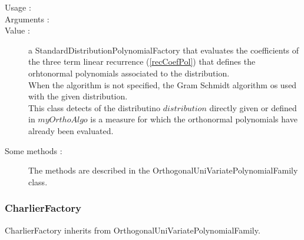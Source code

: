 \begin{description}
\item[Usage :] \rule{0pt}{1em}


\item[Arguments :] \rule{0pt}{1em}


\item[Value :] a StandardDistributionPolynomialFactory that evaluates the coefficients of the three term linear recurrence (\ref{recCoefPol}) that defines the orhtonormal polynomials associated to the distribution.\\
When the algorithm is not specified, the Gram Schmidt algorithm os used with the given distribution.\\
This class detects of the distributino $distribution$ directly given or defined in  $myOrthoAlgo$ is a measure for which the orthonormal polynomials have already been evaluated.


\item[Some methods :]  The methods are described in the OrthogonalUniVariatePolynomialFamily class.

\end{description}

 



\newpage
\subsubsection{CharlierFactory}


CharlierFactory inherits from OrthogonalUniVariatePolynomialFamily.

